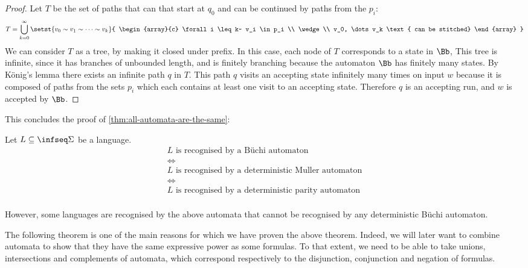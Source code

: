 \begin{proof}
    Let $T$ be the set of paths that can that start at $q_0$
    and can be continued by paths from the $p_i$:
    \[
        T = \bigcup_{k=0}^{\infty} \setst{
                v_0 \sim v_1 \sim \dots \sim v_k
            }{
                \begin{array}{c}
                    \forall i \leq k~
                    v_i \in p_i \\
                    \wedge \\
                    v_0, \dots v_k
                    \text{ can be stitched}
                \end{array}
            }
    \]
    We can consider $T$ as a tree, by making it closed under prefix.
    In this case, each node of $T$ corresponds to a state in $\Bb$,
    This tree is infinite,
    since it has branches of unbounded length, and is finitely branching
    because the automaton $\Bb$ has finitely many states.
    By König's lemma there exists an infinite path $q$ in $T$.
    This path $q$ visits an accepting state infinitely many times
    on input $w$ because it is composed of paths from the sets $p_i$
    which each contains at least one visit to an accepting state.
    Therefore $q$ is an accepting run, and $w$ is accepted by $\Bb$.
\end{proof}

This concludes the proof of \autoref{thm:all-automata-are-the-same}:

\begin{theorem*}[\ref{thm:all-automata-are-the-same}]
    Let $L \subseteq \infseq\Sigma$ be a language.
    \[
        \begin{array}{c}
        L \text{ is recognised by a Büchi automaton} \\
        \iff \\
        L \text{ is recognised by a deterministic Muller automaton} \\
        \iff \\
        L \text{ is recognised by a deterministic parity automaton} \\
        \end{array}
    \]

    However, some languages are recognised by the above
    automata that cannot be recognised by any deterministic Büchi automaton.
\end{theorem*}

The following theorem is one of the main reasons for which we have
proven the above theorem. Indeed, we will later want to combine
automata to show that they have the same expressive power as
some formulas. To that extent, we need to be able to take
unions, intersections and complements of automata, which
correspond respectively to the disjunction, conjunction and negation of
formulas.

